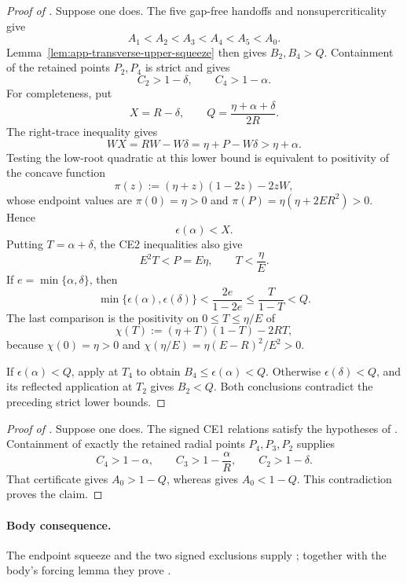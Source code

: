 \begin{proof}[Proof of ]
Suppose one does.  The five gap-free handoffs and nonsupercriticality give
\[
 A_1<A_2<A_3<A_4<A_5<A_0.
\]
Lemma~\ref{lem:app-transverse-upper-squeeze} then gives
$B_2,B_4>Q$.  Containment of the retained points $P_2,P_4$ is strict and
gives
\[
 C_2>1-\delta,
 \qquad C_4>1-\alpha.
\]
For completeness, put
\[
 X=R-\delta,
 \qquad Q=\frac{\eta+\alpha+\delta}{2R}.
\]
The right-trace inequality gives
\[
 WX=RW-W\delta=\eta+P-W\delta>\eta+\alpha.
\]
Testing the low-root quadratic at this lower bound is equivalent to
positivity of the concave function
\[
 \pi(z):=(\eta+z)(1-2z)-2zW,
\]
whose endpoint values are
$\pi(0)=\eta>0$ and $\pi(P)=\eta(\eta+2ER^2)>0$.  Hence
\[
 \epsilon(\alpha)<X.
\]
Putting $T=\alpha+\delta$, the CE2 inequalities also give
\[
 E^2T<P=E\eta,
 \qquad T<\frac\eta E.
\]
If $e=\min\{\alpha,\delta\}$, then
\[
 \min\{\epsilon(\alpha),\epsilon(\delta)\}
 <\frac{2e}{1-2e}\le\frac{T}{1-T}<Q.
\]
The last comparison is the positivity on $0\le T\le\eta/E$ of
\[
 \chi(T):=(\eta+T)(1-T)-2RT,
\]
because $\chi(0)=\eta>0$ and
$\chi(\eta/E)=\eta(E-R)^2/E^2>0$.

If $\epsilon(\alpha)<Q$, apply
 at $T_4$ to obtain $B_4\le
\epsilon(\alpha)<Q$.  Otherwise
$\epsilon(\delta)<Q$, and its reflected application at $T_2$ gives
$B_2<Q$.  Both conclusions contradict the preceding strict lower bounds.
\end{proof}

\begin{proof}[Proof of ]
Suppose one does.  The signed CE1 relations satisfy the hypotheses of
.  Containment of exactly the retained
radial points $P_4,P_3,P_2$ supplies
\[
 C_4>1-\alpha,
 \qquad C_3>1-\frac\alpha R,
 \qquad C_2>1-\delta.
\]
That certificate gives $A_0>1-Q$, whereas
 gives $A_0<1-Q$.  This
contradiction proves the claim.
\end{proof}

\paragraph{Body consequence.}
The endpoint squeeze and the two signed exclusions supply
; together with the
body's forcing lemma they prove .

